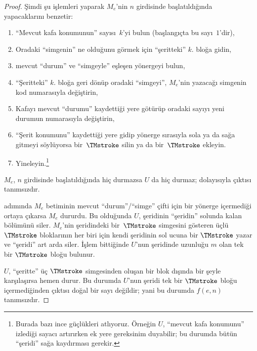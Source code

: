 \documentclass[../../../include/open-logic-section]{subfiles}
\begin{document}
\begin{proof}
  Şimdi şu işlemleri yaparak $M_e$'nin $n$ girdisinde başlatıldığında
  yapacaklarını benzetir:
  \begin{enumerate}
    \item ``Mevcut kafa konumunun'' sayısı~$k$'yi bulun (başlangıçta bu
    sayı~$1$'dir),
    \item Oradaki ``simgenin'' ne olduğunu görmek için ``şeritteki'' $k$.
    bloğa gidin,
    \item{}%
    mevcut ``durum'' ve ``simgeyle'' eşleşen yönergeyi bulun,
    \item ``Şeritteki'' $k$. bloğa geri dönüp oradaki ``simgeyi'', $M_e$'nin
    yazacağı simgenin kod numarasıyla değiştirin,
    \item Kafayı mevcut ``durumu'' kaydettiği yere götürüp oradaki sayıyı
    yeni durumun numarasıyla değiştirin,
    \item ``Şerit konumunu'' kaydettiği yere gidip yönerge sırasıyla sola ya
    da sağa gitmeyi söylüyorsa bir~$\TMstroke$ silin ya da
    bir~$\TMstroke$ ekleyin.
    \item Yineleyin.\footnote{Burada bazı ince güçlükleri atlıyoruz. Örneğin
    $U$, ``mevcut kafa konumunu'' izlediği sayacı artırırken ek yere gereksinim
    duyabilir; bu durumda bütün ``şeridi'' sağa kaydırması gerekir.}
  \end{enumerate}
  $M_e$, $n$ girdisinde başlatıldığında hiç durmazsa $U$ da hiç durmaz;
  dolayısıyla çıktısı tanımsızdır.

   adımında $M_e$ betiminin mevcut ``durum''/``simge'' çifti
  için bir yönerge içermediği ortaya çıkarsa $M_e$ dururdu. Bu olduğunda $U$,
  şeridinin ``şeridin'' solunda kalan bölümünü siler. $M_e$'nin şeridindeki
  bir~$\TMstroke$ simgesini gösteren üçlü $\TMstroke$ bloklarının her biri
  için kendi şeridinin sol ucuna bir $\TMstroke$ yazar ve ``şeridi'' art arda
  siler. İşlem bittiğinde $U$'nun şeridinde uzunluğu $m$ olan tek bir
  $\TMstroke$ bloğu bulunur.
  
  $U$, ``şeritte'' üç $\TMstroke$ simgesinden oluşan bir blok dışında bir
  şeyle karşılaşırsa hemen durur. Bu durumda $U$'nun şeridi tek bir
  $\TMstroke$ bloğu içermediğinden çıktısı doğal bir sayı değildir; yani bu
  durumda $f(e,n)$ tanımsızdır.
\end{proof}
\end{document}
